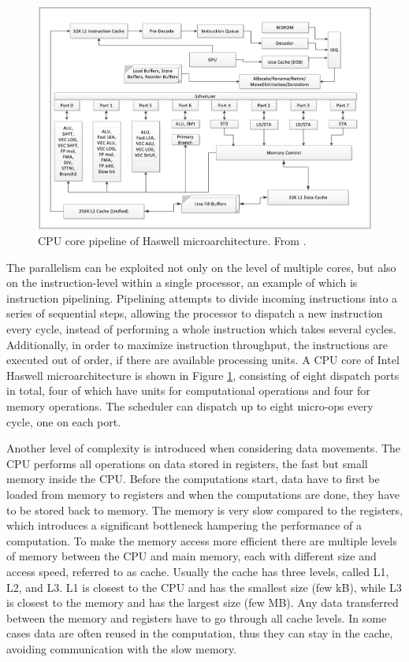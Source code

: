 \begin{figure}[ht]
  \centering
  \includegraphics[width=\textwidth]{images/haswell_microarchitecture.png}
  \caption{CPU core pipeline of Haswell microarchitecture. From \cite{intel-orm-2016}.}
  \label{fig:hsw-microarch}
\end{figure}

The parallelism can be exploited not only on the level of multiple cores, but also on the instruction-level within a single processor, an example of which is instruction pipelining. Pipelining attempts to divide incoming instructions into a series of sequential steps, allowing the processor to dispatch a new instruction every cycle, instead of performing a whole instruction which takes several cycles. Additionally, in order to maximize instruction throughput, the instructions are executed out of order, if there are available processing units.
A CPU core of Intel Haswell microarchitecture is shown in Figure \ref{fig:hsw-microarch}, consisting of eight dispatch ports in total, four of which have units for computational operations and four for memory operations. The scheduler can dispatch up to eight micro-ops every cycle, one on each port.

Another level of complexity is introduced when considering data movements. The CPU performs all operations on data stored in registers, the fast but small memory inside the CPU. Before the computations start, data have to first be loaded from memory to registers and when the computations are done, they have to be stored back to memory. The memory is very slow compared to the registers, which introduces a significant bottleneck hampering the performance of a computation. To make the memory access more efficient there are multiple levels of memory between the CPU and main memory, each with different size and access speed, referred to as cache. Usually the cache has three levels, called L1, L2, and L3. L1 is closest to the CPU and has the smallest size (few kB), while L3 is closest to the memory and has the largest size (few MB). Any data transferred between the memory and registers have to go through all cache levels. 
In some cases data are often reused in the computation, thus they can stay in the cache, avoiding communication with the slow memory.

